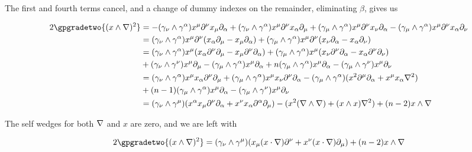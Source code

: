 The first and fourth terms cancel, and a change of dummy indexes on the remainder, eliminating $\beta$, gives us

\begin{align*}
2 \gpgradetwo{(x \wedge \grad)^2 } 
&=
-
(\gamma_\nu \wedge \gamma^\alpha ) x^\mu \partial^\nu x_\mu \partial_\alpha
+
(\gamma_\nu \wedge \gamma^\alpha ) x^\mu \partial^\nu x_\alpha \partial_\mu 
+ 
( \gamma_\mu \wedge \gamma^\alpha ) x^\mu \partial^\nu x_\nu \partial_\alpha
- 
( \gamma_\mu \wedge \gamma^\alpha ) x^\mu \partial^\nu x_\alpha \partial_\nu \\
&=
(\gamma_\nu \wedge \gamma^\alpha ) x^\mu \partial^\nu (x_\alpha \partial_\mu - x_\mu \partial_\alpha)
+( \gamma_\mu \wedge \gamma^\alpha ) x^\mu \partial^\nu (x_\nu \partial_\alpha - x_\alpha \partial_\nu) \\
&=
(\gamma_\nu \wedge \gamma^\alpha ) x^\mu (x_\alpha \partial^\nu \partial_\mu - x_\mu \partial^\nu \partial_\alpha)
+( \gamma_\mu \wedge \gamma^\alpha ) x^\mu (x_\nu \partial^\nu \partial_\alpha - x_\alpha \partial^\nu \partial_\nu) \\
&
+(\gamma_\nu \wedge \gamma^\nu ) x^\mu \partial_\mu 
-(\gamma_\mu \wedge \gamma^\alpha ) x^\mu \partial_\alpha
+n ( \gamma_\mu \wedge \gamma^\alpha ) x^\mu \partial_\alpha 
-( \gamma_\mu \wedge \gamma^\nu ) x^\mu \partial_\nu 
\\
&=
(\gamma_\nu \wedge \gamma^\alpha ) x^\mu x_\alpha \partial^\nu \partial_\mu 
+( \gamma_\mu \wedge \gamma^\alpha ) x^\mu x_\nu \partial^\nu \partial_\alpha 
-(\gamma_\mu \wedge \gamma^\alpha ) ( x^2 \partial^\mu \partial_\alpha + x^\mu x_\alpha \grad^2 ) \\
&
+(n-1)(\gamma_\mu \wedge \gamma^\alpha ) x^\mu \partial_\alpha
-( \gamma_\mu \wedge \gamma^\nu ) x^\mu \partial_\nu 
\\
&=
(\gamma_\nu \wedge \gamma^\mu ) ( x^\alpha x_\mu \partial^\nu \partial_\alpha + x^\nu x_\alpha \partial^\alpha \partial_\mu )
- ( x^2 (\grad \wedge \grad) + ( x \wedge x ) \grad^2 ) 
+(n-2) x \wedge \grad
\\
\end{align*}

The self wedges for both $\nabla$ and $x$ are zero, and we are left with

\begin{align*}
2 \gpgradetwo{(x \wedge \grad)^2 } 
&=
(\gamma_\nu \wedge \gamma^\mu ) ( x_\mu (x \cdot \grad) \partial^\nu + x^\nu (x \cdot \grad) \partial_\mu )
+(n-2) x \wedge \grad
\\
\end{align*}

